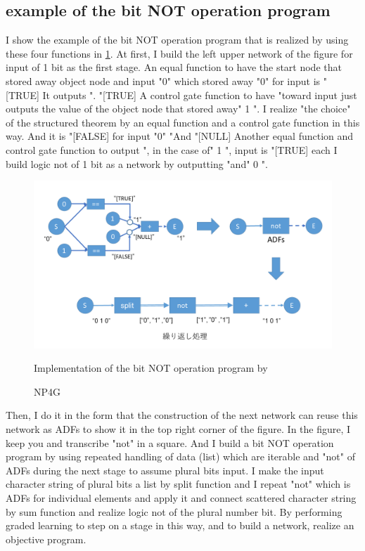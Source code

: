 \documentclass{article}
\begin{document}
\subsection {example of the bit NOT operation program}
I show the example of the bit NOT operation program that is realized by using these four functions in \ref{fig:bitwise_not}.
At first, I build the left upper network of the figure for input of 1 bit as the first stage.
An equal function to have the start node that stored away object node and input "0" which stored away "0" for input is "[TRUE]
It outputs ".
"[TRUE]
A control gate function to have "toward input just outputs the value of the object node that stored away" 1 ".
I realize "the choice" of the structured theorem by an equal function and a control gate function in this way.
And it is "[FALSE] for input "0"
"And "[NULL]
Another equal function and control gate function to output ", in the case of" 1 ", input is "[TRUE] each
I build logic not of 1 bit as a network by outputting "and" 0 ".
\begin{figure}[t]
\begin{center}
\includegraphics[width=150mm]{bitwise_not.png}
\end{center}
Implementation of the bit NOT operation program by \caption{NP4G}
\label{fig:bitwise_not}
\end{figure}
Then, I do it in the form that the construction of the next network can reuse this network as ADFs to show it in the top right corner of the figure.
In the figure, I keep you and transcribe "not" in a square.
And I build a bit NOT operation program by using repeated handling of data (list) which are iterable and "not" of ADFs during the next stage to assume plural bits input.
I make the input character string of plural bits a list by split function and I repeat "not" which is ADFs for individual elements and apply it and connect scattered character string by sum function and realize logic not of the plural number bit.
By performing graded learning to step on a stage in this way, and to build a network, realize an objective program.
\end{document}
